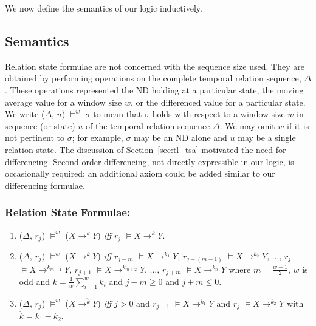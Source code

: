 We now define the semantics of our logic inductively.

\subsection{Semantics}\label{subsec:tl_semantics}
Relation state formulae are not concerned with the sequence size
used. They are obtained by performing operations on the complete
temporal relation sequence, $\Delta$. These operations represented the
ND holding at a particular state, the moving average value for a
window size $w$, or the differenced value for a particular state. We
write ($\Delta$, $u$) $\models^w$ $\sigma$ to mean that $\sigma$ holds
with respect to a window size $w$ in sequence (or state) $u$ of the
temporal relation sequence $\Delta$. We may omit $w$ if it is not
pertinent to $\sigma$; for example, $\sigma$ may be an ND alone and
$u$ may be a single relation state. The discussion of
Section~\ref{sec:tl_tsa} motivated the need for differencing. Second
order differencing, not directly expressible in our logic, is
occasionally required; an additional axiom could be added similar to
our differencing formulae.


\subsubsection{Relation State Formulae:}
\begin{enumerate}

\item\label{item:nd} ($\Delta$, $r_j$) $\models^w$ ($X
\to^{k} Y$) { \em iff } $r_{j}$ $\models X \to^{k} Y$.

\item\label{item:ma} ($\Delta$, $r_j$) $\models^w$ ($X
\to^{\bar{{k}}} Y$) { \em iff } $r_{j-m}$
$\models X \to^{{k}_1} Y$,  $r_{j-(m-1)}$
$\models X \to^{{k}_2} Y$, $\ldots$,  $r_{j}$
$\models X \to^{{k}_{m+1}} Y$,  $r_{j+1}$ 
$\models X \to^{{k}_{m+2}} Y$, $\ldots$,  $r_{j+m}$
$\models X \to^{{k}_n} Y$ where $m = \frac{w-1}{2}$, $w$ is odd
and $\bar{{k}} = \frac{1}{w} \sum_{i = 1}^{w} {k}_i$
and $j - m \ge 0$ and $j + m \le 0$.

\item\label{item:diff} ($\Delta$, $r_j$) $\models^w$ ($X 
{\to}^{\ddot{{k}}}  Y$) { \em iff } $j > 0$ and $r_{j-1}$
$\models X \to^{{k}_1} Y$ and  $r_{j}$
$\models X \to^{{k}_2} Y$ with $\ddot{{k}} = {{k}_1} -{{k}_2}$.


\end{enumerate}

